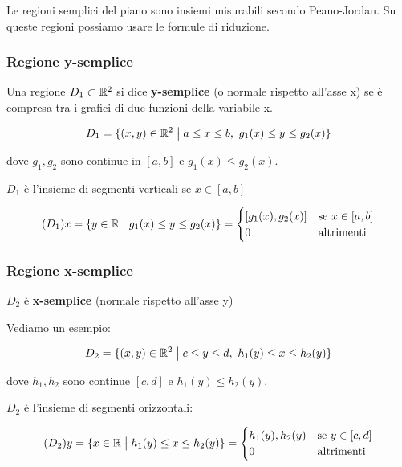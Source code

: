Le regioni semplici del piano sono insiemi misurabili secondo Peano-Jordan. Su queste regioni possiamo usare le formule di riduzione.

\subsubsection*{Regione y-semplice}

Una regione \(D_1 \subset \mathbb{R}^2\) si dice \textbf{y-semplice} (o normale rispetto all'asse x) se è compresa tra i grafici di due funzioni della variabile x.

\[
    D_1= \{(x,y) \in \mathbb{R}^2 \;\big|\; a \le x \le b,\ g_1(x) \le y \le g_2(x)\}
\]

dove \(g_1,g_2\) sono continue in \([a,b]\) e \(g_1(x) \le g_2(x)\).

\(D_1\) è l'insieme di segmenti verticali se \(x \in [a,b]\)

\[
    (D_1)x = \{y \in \mathbb{R} \;\big|\; g_1(x) \le y \le g_2(x)\} = \begin{cases}
        [g_1(x),g_2(x)] & \text{se \(x \in [a,b]\)} \\
        0               & \text{altrimenti}
    \end{cases}
\]

\subsubsection*{Regione x-semplice}

\(D_2\) è \textbf{x-semplice} (normale rispetto all'asse y)

Vediamo un esempio:

\[
    D_2= \{(x,y) \in \mathbb{R}^2 \;\big|\; c \le y \le d,\ h_1(y) \le x \le h_2(y)\}
\]

dove \(h_1,h_2\) sono continue \([c,d]\) e \(h_1(y) \le h_2(y)\).

\(D_2\) è l'insieme di segmenti orizzontali:

\[
    (D_2) y = \{x \in \mathbb{R} \;\big|\; h_1(y) \le x \le h_2(y)\} = \begin{cases}
        h_1(y),h_2(y) & \text{se \(y \in [c,d]\)} \\
        0             & \text{altrimenti}
    \end{cases}
\]


